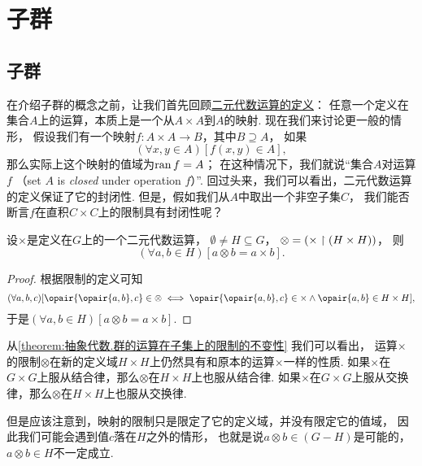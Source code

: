 \section{子群}
\subsection{子群}
在介绍子群的概念之前，让我们首先回顾\hyperref[definition:集合论.二元代数运算]{二元代数运算的定义}：
任意一个定义在集合\(A\)上的运算，本质上是一个从\(A \times A\)到\(A\)的映射.
现在我们来讨论更一般的情形，
假设我们有一个映射\(f\colon A \times A \to B\)，其中\(B \supseteq A\)，
如果\begin{equation*}
	(\forall x,y \in A)[f(x,y) \in A],
\end{equation*}
那么实际上这个映射的值域为\(\operatorname{ran} f = A\)；
在这种情况下，我们就说“集合\(A\)对运算\(f\) %
（set \(A\) is \emph{closed} under operation \(f\)）”.
回过头来，我们可以看出，二元代数运算的定义保证了它的封闭性.
但是，假如我们从\(A\)中取出一个非空子集\(C\)，
我们能否断言\(f\)在直积\(C \times C\)上的限制具有封闭性呢？

\begin{lemma}\label{theorem:抽象代数.群的运算在子集上的限制的不变性}
设\(\times\)是定义在\(G\)上的一个二元代数运算，
\(\emptyset \neq H \subseteq G\)，
\(\otimes = (\times \upharpoonright(H \times H))\)，
则\begin{equation*}
	(\forall a,b \in H)[a \otimes b = a \times b].
\end{equation*}
\begin{proof}
根据限制的定义可知\begin{equation*}
	(\forall a,b,c)[
		\opair{\opair{a,b},c} \in \otimes
		\iff
		\opair{\opair{a,b},c} \in \times
		\land
		\opair{a,b} \in H \times H
	],
\end{equation*}
于是\((\forall a,b \in H)[a \otimes b = a \times b]\).
\end{proof}
\end{lemma}
从\cref{theorem:抽象代数.群的运算在子集上的限制的不变性} 我们可以看出，
运算\(\times\)的限制\(\otimes\)在新的定义域\(H \times H\)上仍然具有和原本的运算\(\times\)一样的性质.
如果\(\times\)在\(G \times G\)上服从结合律，那么\(\otimes\)在\(H \times H\)上也服从结合律.
如果\(\times\)在\(G \times G\)上服从交换律，那么\(\otimes\)在\(H \times H\)上也服从交换律.

但是应该注意到，映射的限制只是限定了它的定义域，并没有限定它的值域，
因此我们可能会遇到值\(c\)落在\(H\)之外的情形，
也就是说\(a \otimes b \in(G - H)\)是可能的，
\(a \otimes b \in H\)不一定成立.

